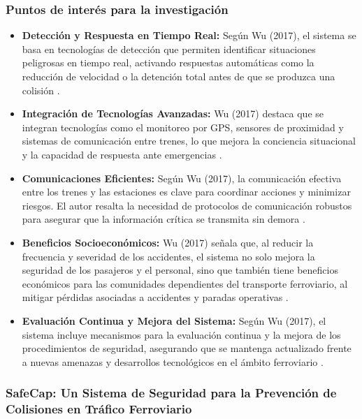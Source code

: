 \documentclass[journal]{IEEEtran}
\begin{document}
\subsubsection*{Puntos de interés para la investigación}  
\begin{itemize}
    \item \textbf{Detección y Respuesta en Tiempo Real:}  
    Según Wu (2017), el sistema se basa en tecnologías de detección que permiten identificar situaciones peligrosas en tiempo real, activando respuestas automáticas como la reducción de velocidad o la detención total antes de que se produzca una colisión \cite{railwaycouncil2017realsafetysystem}.    
    \item \textbf{Integración de Tecnologías Avanzadas:}  
    Wu (2017) destaca que se integran tecnologías como el monitoreo por GPS, sensores de proximidad y sistemas de comunicación entre trenes, lo que mejora la conciencia situacional y la capacidad de respuesta ante emergencias \cite{railwaycouncil2017realsafetysystem}.    
    \item \textbf{Comunicaciones Eficientes:}  
    Según Wu (2017), la comunicación efectiva entre los trenes y las estaciones es clave para coordinar acciones y minimizar riesgos. El autor resalta la necesidad de protocolos de comunicación robustos para asegurar que la información crítica se transmita sin demora \cite{railwaycouncil2017realsafetysystem}.   
    \item \textbf{Beneficios Socioeconómicos:}  
    Wu (2017) señala que, al reducir la frecuencia y severidad de los accidentes, el sistema no solo mejora la seguridad de los pasajeros y el personal, sino que también tiene beneficios económicos para las comunidades dependientes del transporte ferroviario, al mitigar pérdidas asociadas a accidentes y paradas operativas \cite{railwaycouncil2017realsafetysystem}.    
    \item \textbf{Evaluación Continua y Mejora del Sistema:}  
    Según Wu (2017), el sistema incluye mecanismos para la evaluación continua y la mejora de los procedimientos de seguridad, asegurando que se mantenga actualizado frente a nuevas amenazas y desarrollos tecnológicos en el ámbito ferroviario \cite{railwaycouncil2017realsafetysystem}.
\end{itemize}

\subsubsection{SafeCap: Un Sistema de Seguridad para la Prevención de Colisiones en Tráfico Ferroviario}
\end{document}
